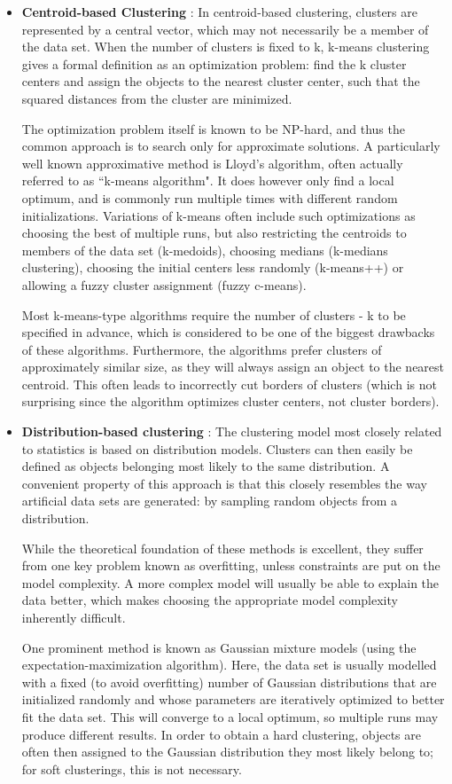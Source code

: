 \begin{itemize}
\item \textbf{Centroid-based Clustering} : In centroid-based clustering, clusters are represented by a central vector,
which may not necessarily be a member of the data set. When the number of clusters is fixed to k, k-means clustering
gives a formal definition as an optimization problem: find the k cluster centers and assign the objects to the nearest
cluster center, such that the squared distances from the cluster are minimized.

The optimization problem itself is known to be NP-hard, and thus the common approach is to search only for approximate
solutions. A particularly well known approximative method is Lloyd's algorithm, often actually referred to as
``k-means algorithm". It does however only find a local optimum, and is commonly run multiple times with different
random initializations. Variations of k-means often include such optimizations as choosing the best of multiple runs,
but also restricting the centroids to members of the data set (k-medoids), choosing medians (k-medians clustering),
choosing the initial centers less randomly (k-means++) or allowing a fuzzy cluster assignment (fuzzy c-means).

Most k-means-type algorithms require the number of clusters - k to be specified in advance, which is considered
to be one of the biggest drawbacks of these algorithms. Furthermore, the algorithms prefer clusters of approximately
similar size, as they will always assign an object to the nearest centroid. This often leads to incorrectly cut
borders of clusters (which is not surprising since the algorithm optimizes cluster centers, not cluster borders).

\item \textbf{Distribution-based clustering} : The clustering model most closely related to statistics is based
on distribution models. Clusters can then easily be defined as objects belonging most likely to the same distribution.
A convenient property of this approach is that this closely resembles the way artificial data sets are generated:
by sampling random objects from a distribution.

While the theoretical foundation of these methods is excellent, they suffer from one key problem known as overfitting,
unless constraints are put on the model complexity. A more complex model will usually be able to explain the data better,
which makes choosing the appropriate model complexity inherently difficult.

One prominent method is known as Gaussian mixture models (using the expectation-maximization algorithm). Here,
the data set is usually modelled with a fixed (to avoid overfitting) number of Gaussian distributions that are
initialized randomly and whose parameters are iteratively optimized to better fit the data set. This will converge
to a local optimum, so multiple runs may produce different results. In order to obtain a hard clustering, objects
are often then assigned to the Gaussian distribution they most likely belong to; for soft clusterings, this is not
necessary.


\end{itemize}
